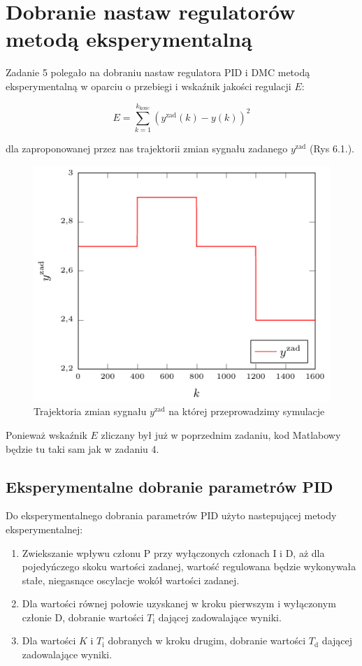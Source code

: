 \chapter{Dobranie nastaw regulatorów metodą eksperymentalną}
Zadanie 5 polegało na dobraniu nastaw regulatora PID i DMC metodą eksperymentalną w oparciu o przebiegi i wskaźnik jakości regulacji $E$:

\begin{equation}
    E = \sum_{k=1}^{k_{\mathrm{konc}}}(y^{\mathrm{zad}}(k)-y(k))^{2}
\end{equation}

dla zaproponowanej przez nas trajektorii zmian sygnału zadanego $y^{\mathrm{zad}}$ (Rys 6.1.).

\begin{figure}[tb] 
\centering 
\includegraphics[scale=1]{rysunki/zapisz_pdf/y_zad.pdf} 
\caption{Trajektoria zmian sygnału $y^{\mathrm{zad}}$ na której przeprowadzimy symulacje} 
\label{r_pgfplots_trajektoria} 
\end{figure}

Ponieważ wskaźnik $E$ zliczany był już w poprzednim zadaniu, kod Matlabowy będzie tu taki sam jak w zadaniu 4.

\section{Eksperymentalne dobranie parametrów PID}
Do eksperymentalnego dobrania parametrów PID użyto nastepującej metody eksperymentalnej:
\begin{enumerate}
\item Zwiekszanie wpływu członu P przy wyłączonych członach I i D, aż dla pojedyńczego skoku wartości zadanej, wartość regulowana będzie wykonywała stałe, niegasnące oscylacje wokół wartości zadanej.
\item Dla wartości równej połowie uzyskanej w kroku pierwszym i wyłączonym członie D, dobranie wartości $T_{\mathrm{i}}$ dającej zadowalające wyniki.
\item Dla wartości $K$ i $T_{\mathrm{i}}$ dobranych w kroku drugim, dobranie wartości $T_{\mathrm{d}}$ dającej zadowalające wyniki.
\end{enumerate}


